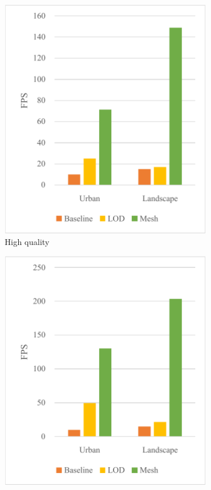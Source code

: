 \begin{figure}[h]
    \begin{subfigure}{0.3\textwidth}
        \centering
        \includegraphics[width=\textwidth]{graph-fps-high.pdf}
        \caption{High quality}
    \end{subfigure}
    \begin{subfigure}{0.3\textwidth}
        \centering
        \includegraphics[width=\textwidth]{graph-fps-med.pdf}

\end{subfigure}
\end{figure}
